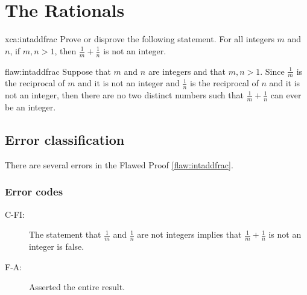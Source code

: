 \section{The Rationals}

\begin{xca}{xca:intaddfrac}
Prove or disprove the following statement. For all integers $m$ and $n$, if $m, n > 1$, then $\frac1m + \frac1n$ is not an integer.
\end{xca}

\begin{flaw}{flaw:intaddfrac}
Suppose that $m$ and $n$ are integers and that $m,n > 1$. Since $\frac1m$ is the reciprocal of $m$ and it is not an integer and $\frac1n$ is the reciprocal of $n$ and it is not an integer, then there are no two distinct numbers such that $\frac1m + \frac1n$ can ever be an integer.
\end{flaw}

\clearpage
\subsection{Error classification}


There are several errors
 in the Flawed Proof \ref{flaw:intaddfrac}. 

\subsubsection{Error codes}

\begin{description}
 	\item[C-FI:] The statement that $\frac1{m}$ and $\frac1{n}$ are not integers implies that $\frac1m + \frac1n$ is not an integer is false.
 	\item[F-A:] Asserted the entire result.
 \end{description}


